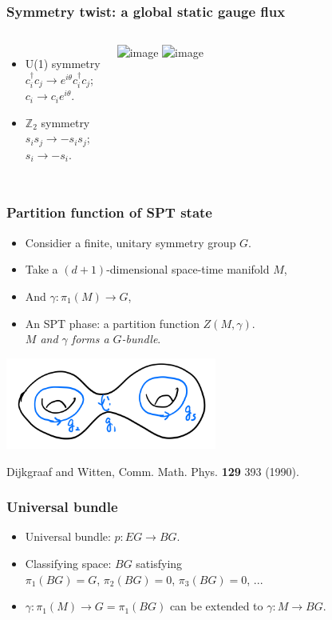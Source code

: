 \documentclass[xcolor=table, aspectratio=43,ignorenonframetext]{beamer}
\begin{document}
\begin{frame}
	\frametitle{Symmetry twist: a global static gauge flux}
	\begin{columns}
		\begin{itemize}
			\item U(1) symmetry\\
			$c_i^\dagger c_j\rightarrow e^{i\theta}c_i^\dagger c_j$;\\
			$c_i\rightarrow c_ie^{i\theta}$.
			\item $\mathbb Z_2$ symmetry\\
			$s_is_j\rightarrow-s_is_j$;\\
			$s_i\rightarrow -s_i$.
		\end{itemize}
		\includegraphics<1>{sym-twist}
		\includegraphics<2>{sym-gauge}
	\end{columns}
\end{frame}

\begin{frame}
	\frametitle{Partition function of SPT state}
	\begin{itemize}
		\item Considier a finite, unitary symmetry group $G$.
		\item Take a $(d+1)$-dimensional space-time manifold $M$,
		\item And $\gamma:\pi_1(M)\rightarrow G$,
		\item An SPT phase: a partition function $Z(M,\gamma)$.\\
		\emph{$M$ and $\gamma$ forms a $G$-bundle}.
	\end{itemize}
	\begin{center}
		\includegraphics[height=3cm]{manifold}
	\end{center}
	{\small Dijkgraaf and Witten, Comm. Math. Phys. \textbf{129} 393 (1990).}
\end{frame}

\begin{frame}
	\frametitle{Universal bundle}
	\begin{itemize}
		\item Universal bundle: $p: EG \rightarrow BG$.
		\item Classifying space: $BG$ satisfying\\
		$\pi_1(BG) = G$, $\pi_2(BG)=0$, $\pi_3(BG)=0$, ...
		\item $\gamma:\pi_1(M)\rightarrow G=\pi_1(BG)$ can be extended to $\gamma:M\rightarrow BG$.
	\end{itemize}
\end{frame}
\end{document}
